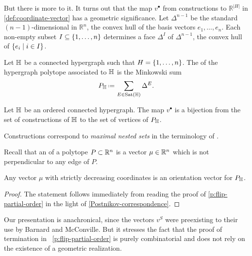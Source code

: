 But there is more to it. 
It turns out that the map $v^{\bullet}$ from constructions to $\mathbb{R}^{|H|}$
in \cref{def:coordinate-vector} has a geometric significance.  
Let $\Delta^{n-1}$ be the standard $(n-1)$-dimensional  in $\mathbb{R}^n$, the convex hull of the basis vectors $e_1,\ldots,e_n$. 
Each non-empty subset $I \subseteq \left\{1,\ldots,n\right\}$ determines a face $\Delta^I$ of $\Delta^{n-1}$, the convex hull of $\left\{e_i \mid i\in I\right\}$. 

\begin{definition}
  Let ${\mathbb H}$ be a connected hypergraph such that $H=\left\{1,\ldots,n\right\}$. 
  The  of the hypergraph polytope associated to ${\mathbb H}$ is the Minkowski sum
  $$P_{\hyper{H}}\eqdef \sum_{E\in{\Sat}(\hyper{H})} \Delta^E.$$
\end{definition}

\begin{proposition}[{\cite[Prop.~7.9]{P09}}] 
  \label{Postnikov-correspondence}
  Let ${\mathbb H}$ be an ordered connected hypergraph.
  The map $v^{\bullet}$ is a bijection from the set of constructions of ${\mathbb H}$ to the set of vertices of $P_{{\mathbb H}}$.
\end{proposition}

Constructions correspond to \emph{maximal nested sets} in the terminology of \cite{P09}.

Recall that an  of a polytope $P\subset \mathbb R^n$ is a vector $\mu \in \mathbb R^n$ which is not perpendicular to any edge of $P$. 

\begin{corollary} 
  \label{Tamari-orientation-vector}
  Any vector $\mu$ with strictly decreasing coordinates is an orientation vector for $P_{{\mathbb H}}$.
\end{corollary} 

\begin{proof}
The statement follows immediately from reading the proof of \cref{p:flip-partial-order} in the light of \cref{Postnikov-correspondence}.
\end{proof}

Our presentation is anachronical, since the vectors $v^S$ were preexisting to their use by Barnard and McConville.
But it stresses the fact that the proof of termination in~ \cref{p:flip-partial-order} is purely combinatorial and does not rely on the existence of a geometric realization.


%

